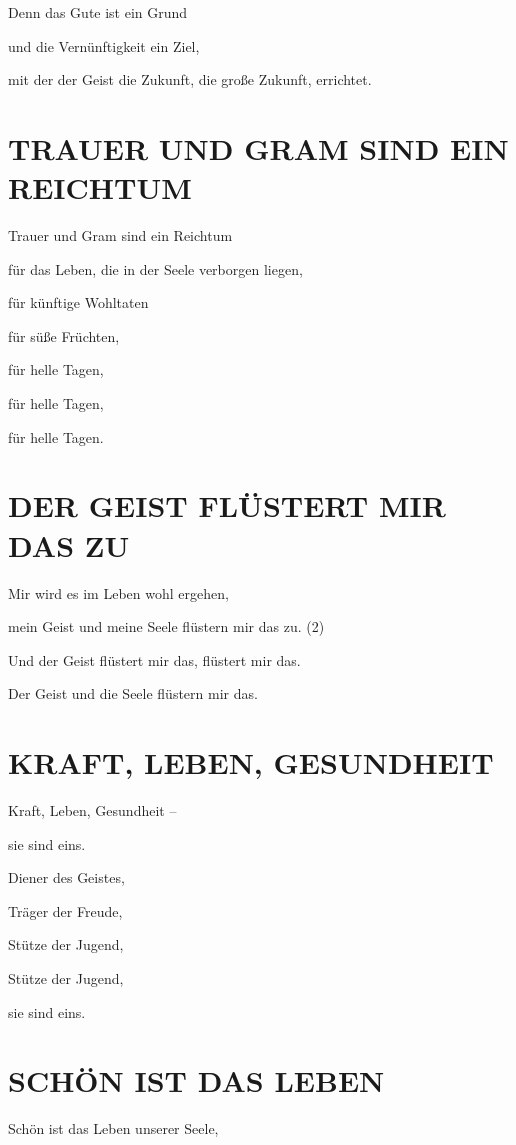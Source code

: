 \documentclass[11pt,a5paper,twoside]{article}
\begin{document}
Denn das Gute ist ein Grund 

und die Vernünftigkeit ein Ziel, 

mit der der Geist die Zukunft, die große Zukunft, errichtet.

\section[Trauer und Gram sind ein Reichtum]{TRAUER UND GRAM SIND EIN REICHTUM}

Trauer und Gram sind ein Reichtum 

für das Leben, die in der Seele verborgen liegen,

für künftige Wohltaten 

für süße Früchten,

für helle Tagen, 
 
für helle Tagen, 
 
für helle Tagen. 

\section[Der Geist flüstert mir das zu]{DER GEIST FLÜSTERT MIR DAS ZU}

Mir wird es im Leben wohl ergehen, 

mein Geist und meine Seele flüstern mir das zu. (2)

Und der Geist flüstert mir das, flüstert mir das.

Der Geist und die Seele flüstern mir das.

\section[Kraft, Leben, Gesundheit]{KRAFT, LEBEN, GESUNDHEIT}

Kraft, Leben, Gesundheit --

sie sind eins. 

Diener des Geistes, 

Träger der Freude, 

Stütze der Jugend, 

Stütze der Jugend, 

sie sind eins. 

\section[Schön ist das Leben]{SCHÖN IST DAS LEBEN}

Schön ist das Leben unserer Seele, 
\end{document}
